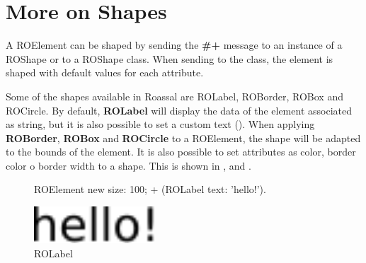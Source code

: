 \documentclass[a4paper,10pt,twoside]{book}
\begin{document}
%


\section{More on Shapes} 

A ROElement can be shaped by sending the \textbf{\#+} message to an instance of a ROShape or to a ROShape class. When sending to the class, the element is shaped with default values for each attribute.

Some of the shapes available in Roassal are ROLabel, ROBorder, ROBox and ROCircle. By default, \textbf{ROLabel} will display the data of the element associated as string, but it is also possible to set a custom text (). When applying \textbf{ROBorder}, \textbf{ROBox} and \textbf{ROCircle} to a ROElement, the shape will be adapted to the bounds of the element. It is also possible to set attributes as color, border color o border width to a shape. This is shown in ,  and .

\begin{figure}[H]
      \begin{minipage}[t]{0.5\textwidth}
      \vspace{0pt}
     \begin{code}
     
	ROElement new 
		size: 100; 
		+ (ROLabel text: 'hello!').	\end{code}
   \end{minipage}
   \hfill
   \begin{minipage}[t]{0.4\textwidth}
      \vspace{0pt} \raggedright
       \centering
		\includegraphics[width=0.4\textwidth]{label}
   \end{minipage}
\caption{ROLabel}
\label{fig:label}
\end{figure}
\end{document}

